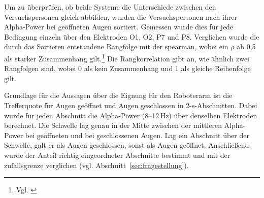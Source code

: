 Um zu überprüfen, ob beide Systeme die Unterschiede zwischen den Versuchspersonen gleich abbilden, wurden die Versuchspersonen nach ihrer Alpha-Power bei geöffneten Augen sortiert. Gemessen wurde dies für jede Bedingung einzeln über den Elektroden O1, O2, P7 und P8. Verglichen wurde die durch das Sortieren entstandene Rangfolge mit der \gls{spearman}, wobei ein $\rho$ ab 0,5 als starker Zusammenhang gilt.\footnote{Vgl. \cite[S.~4]{brydges2019_effectsize}} Die Rangkorrelation gibt an, wie ähnlich zwei Rangfolgen sind, wobei 0 als kein Zusammenhang und 1 als gleiche Reihenfolge gilt.

Grundlage für die Aussagen über die Eignung für den Roboterarm ist die Trefferquote für \glqq Augen geöffnet\grqq{} und \glqq Augen geschlossen\grqq{} in 2-s-Abschnitten. Dabei wurde für jeden Abschnitt die Alpha-Power (8--12\,Hz) über denselben Elektroden berechnet. Die Schwelle lag genau in der Mitte zwischen der mittleren Alpha-Power bei geöffneten und bei geschlossenen Augen. Lag ein Abschnitt über der Schwelle, galt er als \glqq Augen geschlossen\grqq{}, sonst als \glqq Augen geöffnet\grqq{}. Anschließend wurde der Anteil richtig eingeordneter Abschnitte bestimmt und mit der \gls{zufallsgrenze} verglichen (vgl. Abschnitt~\ref{sec:fragestellung}).

